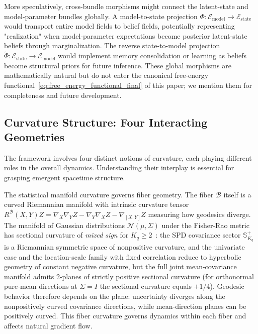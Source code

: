 \documentclass[11pt]{article}
\begin{document}
More speculatively, cross-bundle morphisms might connect the latent-state and model-parameter bundles globally. A model-to-state projection $\Phi: \mathcal{E}_{\mathrm{model}} \to \mathcal{E}_{\mathrm{state}}$ would transport entire model fields to belief fields, potentially representing "realization" when model-parameter expectations become posterior latent-state beliefs through marginalization. The reverse state-to-model projection $\tilde{\Phi}: \mathcal{E}_{\mathrm{state}} \to \mathcal{E}_{\mathrm{model}}$ would implement memory consolidation or learning as beliefs become structural priors for future inference. These global morphisms are mathematically natural but do not enter the canonical free-energy functional~\eqref{eq:free_energy_functional_final} of this paper; we mention them for completeness and future development.

\subsection{Curvature Structure: Four Interacting Geometries}

The framework involves four distinct notions of curvature, each playing different roles in the overall dynamics. Understanding their interplay is essential for grasping emergent spacetime structure.

The statistical manifold curvature governs fiber geometry. The fiber $\mathcal{B}$ itself is a curved Riemannian manifold with intrinsic curvature tensor $R^\mathcal{B}(X,Y)Z = \nabla_X \nabla_Y Z - \nabla_Y \nabla_X Z - \nabla_{[X,Y]} Z$ measuring how geodesics diverge. The manifold of Gaussian distributions $\mathcal{N}(\mu, \Sigma)$ under the Fisher-Rao metric has sectional curvature of \emph{mixed sign} for $K_q \geq 2$~\cite{Skovgaard1984}: the SPD covariance sector $\mathbb{S}^+_{K_q}$ is a Riemannian symmetric space of nonpositive curvature, and the univariate case and the location-scale family with fixed correlation reduce to hyperbolic geometry of constant negative curvature, but the full joint mean-covariance manifold admits 2-planes of strictly positive sectional curvature (for orthonormal pure-mean directions at $\Sigma = I$ the sectional curvature equals $+1/4$). Geodesic behavior therefore depends on the plane: uncertainty diverges along the nonpositively curved covariance directions, while mean-direction planes can be positively curved. This fiber curvature governs dynamics within each fiber and affects natural gradient flow.
\end{document}
